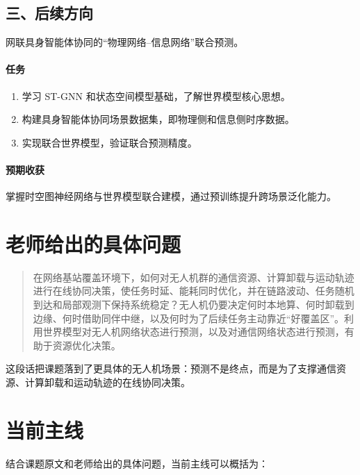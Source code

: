 ﻿\documentclass[UTF8,a4paper,11pt]{ctexart}
\begin{document}
\subsection{三、后续方向}

网联具身智能体协同的“物理网络--信息网络”联合预测。

\paragraph{任务}
\begin{enumerate}
  \item 学习 ST-GNN 和状态空间模型基础，了解世界模型核心思想。
  \item 构建具身智能体协同场景数据集，即物理侧和信息侧时序数据。
  \item 实现联合世界模型，验证联合预测精度。
\end{enumerate}

\paragraph{预期收获}
掌握时空图神经网络与世界模型联合建模，通过预训练提升跨场景泛化能力。

\section{老师给出的具体问题}

\begin{quote}
在网络基站覆盖环境下，如何对无人机群的通信资源、计算卸载与运动轨迹进行在线协同决策，使任务时延、能耗同时优化，并在链路波动、任务随机到达和局部观测下保持系统稳定？无人机仍要决定何时本地算、何时卸载到边缘、何时借助同伴中继，以及何时为了后续任务主动靠近“好覆盖区”。利用世界模型对无人机网络状态进行预测，以及对通信网络状态进行预测，有助于资源优化决策。
\end{quote}

这段话把课题落到了更具体的无人机场景：预测不是终点，而是为了支撑通信资源、计算卸载和运动轨迹的在线协同决策。

\section{当前主线}

结合课题原文和老师给出的具体问题，当前主线可以概括为：

\begin{center}
\end{center}
\end{document}
